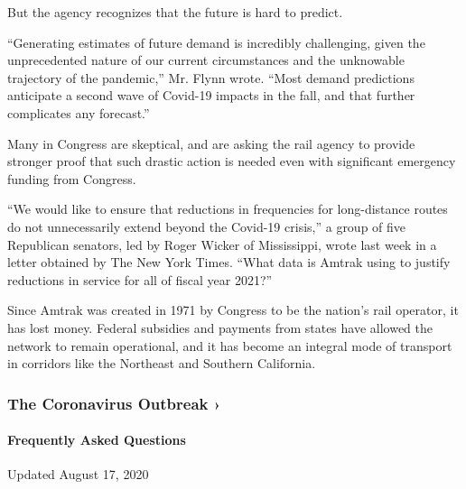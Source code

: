 But the agency recognizes that the future is hard to predict.

``Generating estimates of future demand is incredibly challenging, given
the unprecedented nature of our current circumstances and the unknowable
trajectory of the pandemic,'' Mr. Flynn wrote. ``Most demand predictions
anticipate a second wave of Covid-19 impacts in the fall, and that
further complicates any forecast.''

Many in Congress are skeptical, and are asking the rail agency to
provide stronger proof that such drastic action is needed even with
significant emergency funding from Congress.

``We would like to ensure that reductions in frequencies for
long-distance routes do not unnecessarily extend beyond the Covid-19
crisis,'' a group of five Republican senators, led by Roger Wicker of
Mississippi, wrote last week in a letter obtained by The New York Times.
``What data is Amtrak using to justify reductions in service for all of
fiscal year 2021?''

Since Amtrak was created in 1971 by Congress to be the nation's rail
operator, it has lost money. Federal subsidies and payments from states
have allowed the network to remain operational, and it has become an
integral mode of transport in corridors like the Northeast and Southern
California.

\href{https://www.nytimes3xbfgragh.onion/news-event/coronavirus?action=click\&pgtype=Article\&state=default\&region=MAIN_CONTENT_3\&context=storylines_faq}{}

\hypertarget{the-coronavirus-outbreak-}{%
\subsubsection{The Coronavirus Outbreak
›}\label{the-coronavirus-outbreak-}}

\hypertarget{frequently-asked-questions}{%
\paragraph{Frequently Asked
Questions}\label{frequently-asked-questions}}

Updated August 17, 2020

